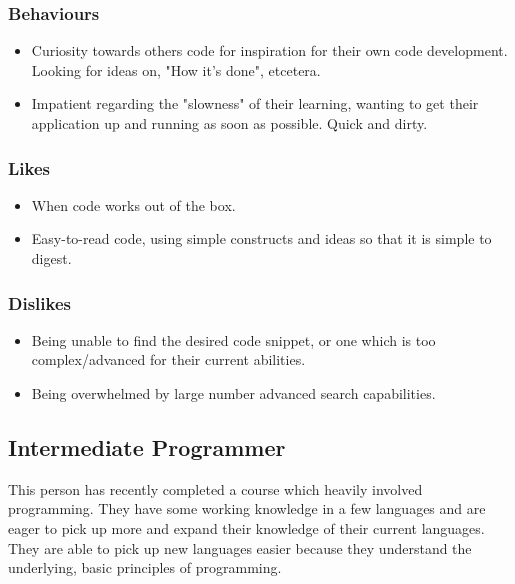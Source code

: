 \documentclass[11pt,a4paper]{article}
\begin{document}
\subsubsection{Behaviours}

\begin{itemize}
\item Curiosity towards others code for inspiration for their own code
development. Looking for ideas on, "How it's done", etcetera.
\item Impatient regarding the "slowness" of their learning, wanting to
get their application up and running as soon as possible. Quick and
dirty.
\end{itemize}

\subsubsection{Likes}

\begin{itemize}
\item When code works out of the box.
\item Easy-to-read code, using simple constructs and ideas so that it
is simple to digest.
\end{itemize}

\subsubsection{Dislikes}

\begin{itemize}
\item Being unable to find the desired code snippet, or one which is
too complex/advanced for their current abilities.
\item Being overwhelmed by large number advanced search capabilities.
\end{itemize}

\newpage

\subsection{Intermediate Programmer}

This person has recently completed a course which heavily involved programming.
They have some working knowledge in a few languages and are eager to pick up
more and expand their knowledge of their current languages. They are able to
pick up new languages easier because they understand the underlying, basic
principles of programming.
\end{document}
